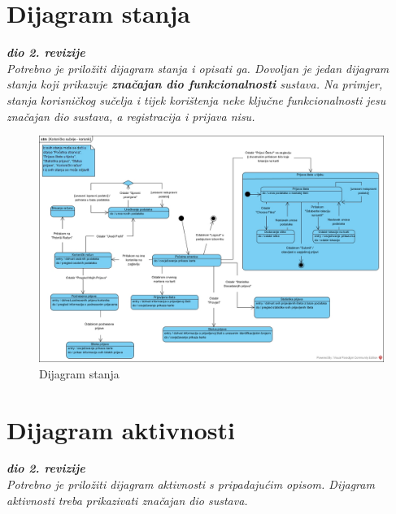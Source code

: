 \section{Dijagram stanja}


\textbf{\textit{dio 2. revizije}}\\

\textit{Potrebno je priložiti dijagram stanja i opisati ga. Dovoljan je jedan dijagram stanja koji prikazuje \textbf{značajan dio funkcionalnosti} sustava. Na primjer, stanja korisničkog sučelja i tijek korištenja neke ključne funkcionalnosti jesu značajan dio sustava, a registracija i prijava nisu. }

\begin{figure}[H]
	\includegraphics[scale=0.4]{slike/DS.jpg} %
	\centering
	\caption{Dijagram stanja}
	\label{fig:DijagramStanja}
\end{figure}

\eject

\section{Dijagram aktivnosti}

\textbf{\textit{dio 2. revizije}}\\

\textit{Potrebno je priložiti dijagram aktivnosti s pripadajućim opisom. Dijagram aktivnosti treba prikazivati značajan dio sustava.}

